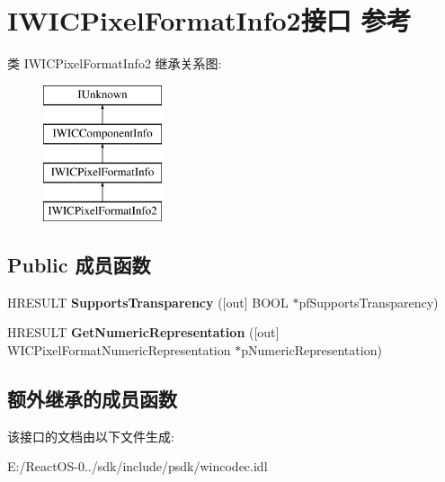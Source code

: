 \hypertarget{interface_i_w_i_c_pixel_format_info2}{}\section{I\+W\+I\+C\+Pixel\+Format\+Info2接口 参考}
\label{interface_i_w_i_c_pixel_format_info2}
类 I\+W\+I\+C\+Pixel\+Format\+Info2 继承关系图\+:\begin{figure}[H]
\begin{center}
\leavevmode
\includegraphics[height=4.000000cm]{interface_i_w_i_c_pixel_format_info2}
\end{center}
\end{figure}
\subsection*{Public 成员函数}
\begin{DoxyCompactItemize}
\item 
\mbox{\label{interface_i_w_i_c_pixel_format_info2_a368c4417512d3b4b6c84e68e53fb638f}} 
H\+R\+E\+S\+U\+LT {\bfseries Supports\+Transparency} (\mbox{[}out\mbox{]} B\+O\+OL $\ast$pf\+Supports\+Transparency)
\item 
\mbox{\label{interface_i_w_i_c_pixel_format_info2_a7bc3b116d37a3af88999b6e4addae592}} 
H\+R\+E\+S\+U\+LT {\bfseries Get\+Numeric\+Representation} (\mbox{[}out\mbox{]} W\+I\+C\+Pixel\+Format\+Numeric\+Representation $\ast$p\+Numeric\+Representation)
\end{DoxyCompactItemize}
\subsection*{额外继承的成员函数}


该接口的文档由以下文件生成\+:\begin{DoxyCompactItemize}
\item 
E\+:/\+React\+O\+S-\/0../sdk/include/psdk/wincodec.\+idl\end{DoxyCompactItemize}
